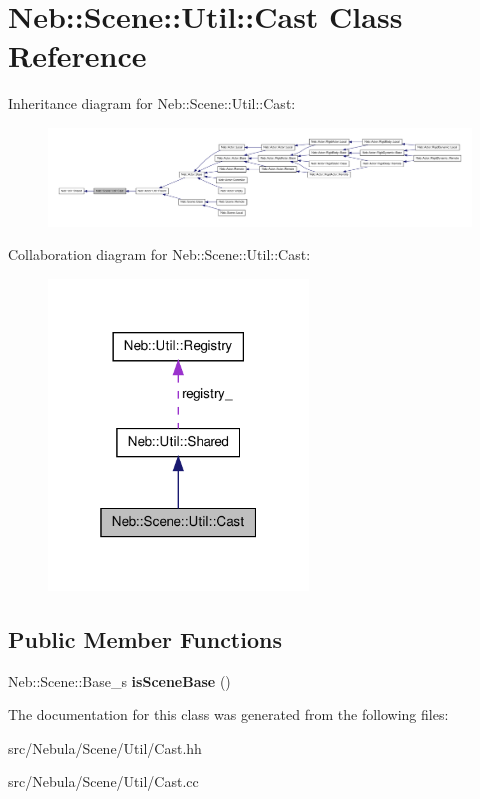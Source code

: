 \hypertarget{classNeb_1_1Scene_1_1Util_1_1Cast}{\section{\-Neb\-:\-:\-Scene\-:\-:\-Util\-:\-:\-Cast \-Class \-Reference}
\label{classNeb_1_1Scene_1_1Util_1_1Cast}
}


\-Inheritance diagram for \-Neb\-:\-:\-Scene\-:\-:\-Util\-:\-:\-Cast\-:\nopagebreak
\begin{figure}[H]
\begin{center}
\leavevmode
\includegraphics[width=350pt]{classNeb_1_1Scene_1_1Util_1_1Cast__inherit__graph}
\end{center}
\end{figure}


\-Collaboration diagram for \-Neb\-:\-:\-Scene\-:\-:\-Util\-:\-:\-Cast\-:\nopagebreak
\begin{figure}[H]
\begin{center}
\leavevmode
\includegraphics[width=196pt]{classNeb_1_1Scene_1_1Util_1_1Cast__coll__graph}
\end{center}
\end{figure}
\subsection*{\-Public \-Member \-Functions}
\begin{DoxyCompactItemize}
\item 
\hypertarget{classNeb_1_1Scene_1_1Util_1_1Cast_a53c12edc6e698f1f5f4889fc54f4f9ee}{\-Neb\-::\-Scene\-::\-Base\-\_\-s {\bfseries is\-Scene\-Base} ()}\label{classNeb_1_1Scene_1_1Util_1_1Cast_a53c12edc6e698f1f5f4889fc54f4f9ee}

\end{DoxyCompactItemize}


\-The documentation for this class was generated from the following files\-:\begin{DoxyCompactItemize}
\item 
src/\-Nebula/\-Scene/\-Util/\-Cast.\-hh\item 
src/\-Nebula/\-Scene/\-Util/\-Cast.\-cc\end{DoxyCompactItemize}
